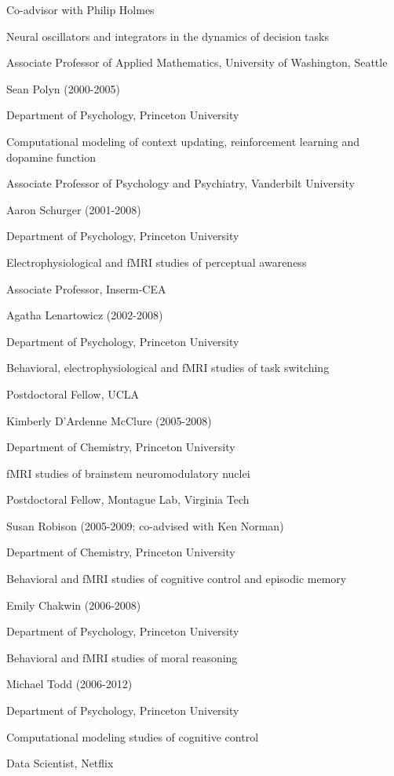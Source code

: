 \documentclass[10 pt]{article}
\begin{document}
Co-advisor with Philip Holmes

Neural oscillators and integrators in the dynamics of decision tasks

Associate Professor of Applied Mathematics, University of Washington, Seattle
    \medskip

Sean Polyn (2000-2005)

Department of Psychology, Princeton University

Computational modeling of context updating, reinforcement learning and dopamine function

Associate Professor of Psychology and Psychiatry, Vanderbilt University
    \medskip

Aaron Schurger (2001-2008)

Department of Psychology, Princeton University

Electrophysiological and fMRI studies of perceptual awareness

Associate Professor, Inserm-CEA
    \medskip

Agatha Lenartowicz (2002-2008)

Department of Psychology, Princeton University

Behavioral, electrophysiological and fMRI studies of task switching

Postdoctoral Fellow, UCLA
    \medskip

Kimberly D’Ardenne McClure (2005-2008)

Department of Chemistry, Princeton University

fMRI studies of brainstem neuromodulatory nuclei

Postdoctoral Fellow, Montague Lab, Virginia Tech
    \medskip

Susan Robison (2005-2009; co-advised with Ken Norman)

Department of Chemistry, Princeton University

Behavioral and fMRI studies of cognitive control and episodic memory
    \medskip

Emily Chakwin (2006-2008)

Department of Psychology, Princeton University

Behavioral and fMRI studies of moral reasoning
    \medskip

Michael Todd (2006-2012)

Department of Psychology, Princeton University

Computational modeling studies of cognitive control

Data Scientist, Netflix
    \medskip
\end{document}
